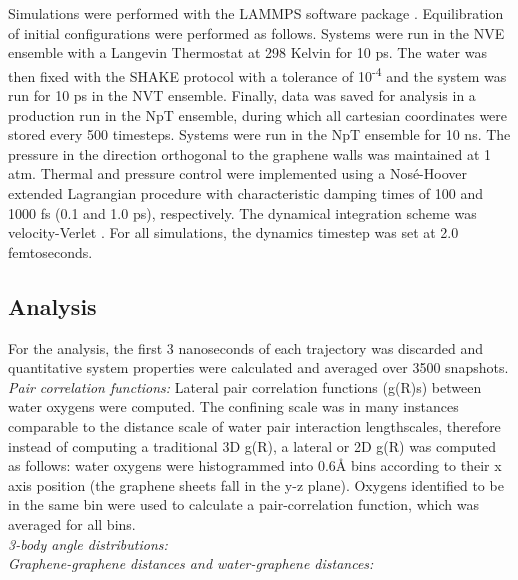 \documentclass[12pt]{article}
\begin{document}
Simulations were performed with the LAMMPS software package \cite{Plimpton1995}. 
Equilibration of initial configurations were performed as follows. Systems were run in 
the NVE ensemble with a Langevin Thermostat at 298 Kelvin
for 10 ps. The water was then fixed with the SHAKE protocol \cite{Andersen1983} with a tolerance
of 10\textsuperscript{-4} and the system was run for 10 ps in the NVT ensemble.
Finally, data was saved for analysis in a production run in the NpT ensemble,
during which all cartesian coordinates were stored every 500 timesteps. 
Systems were run in the NpT ensemble for 10 ns. The 
pressure in the direction orthogonal to the graphene walls was maintained at 1 atm.
Thermal and pressure control were implemented using a Nos\' e-Hoover 
extended Lagrangian procedure \cite{Martyna1994} with characteristic damping times of 100 
and 1000 fs (0.1 and 1.0 ps), respectively. The dynamical integration 
scheme was velocity-Verlet \cite{Swope1982}.
For all simulations, the dynamics timestep was set at 2.0 femtoseconds. 

\subsection*{Analysis}

For the analysis, the first 3 nanoseconds of each trajectory was discarded and quantitative system properties were calculated and averaged over 3500 snapshots. \\

\textit{Pair correlation functions:} Lateral pair correlation functions (g(R)s) between water oxygens were computed. The confining scale was in many instances comparable to the distance scale of water pair interaction lengthscales, therefore instead of computing a traditional 3D g(R), a lateral or 2D g(R) was computed as follows: water oxygens were histogrammed into 0.6\r A bins according to their x axis position (the graphene sheets fall in the y-z plane). Oxygens identified to be in the same bin were used to calculate a pair-correlation function, which was averaged for all bins. \\%

\textit{3-body angle distributions:} \\

\textit{Graphene-graphene distances and water-graphene distances:} \\
\end{document}
